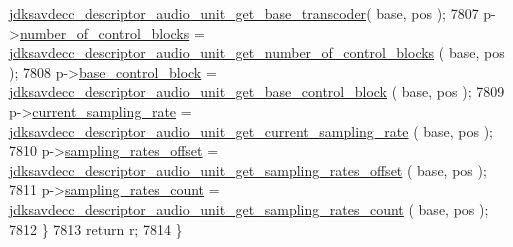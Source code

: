 \begin{DoxyCode}
      \hyperlink{group__descriptor__audio_ga255b528b5d801b3c172b8d199e03ef42}{jdksavdecc\_descriptor\_audio\_unit\_get\_base\_transcoder}( 
      base, pos );
7807         p->\hyperlink{structjdksavdecc__descriptor__audio__unit_a564f961a8cec6e8f7b4bfdbbbfe650d4}{number\_of\_control\_blocks} = 
      \hyperlink{group__descriptor__audio_ga30d371f29fe321c59cc09f811fb280b6}{jdksavdecc\_descriptor\_audio\_unit\_get\_number\_of\_control\_blocks}
      ( base, pos );
7808         p->\hyperlink{structjdksavdecc__descriptor__audio__unit_a9303491ec92ba42c28fb904c14d310b0}{base\_control\_block} = 
      \hyperlink{group__descriptor__audio_ga618003ae29a76ad480334653c52cb393}{jdksavdecc\_descriptor\_audio\_unit\_get\_base\_control\_block}
      ( base, pos );
7809         p->\hyperlink{structjdksavdecc__descriptor__audio__unit_a081e14c5c832a659daf22003ed8e918d}{current\_sampling\_rate} = 
      \hyperlink{group__descriptor__audio_gaf64e490813c4a70bd63a6f00374cb639}{jdksavdecc\_descriptor\_audio\_unit\_get\_current\_sampling\_rate}
      ( base, pos );
7810         p->\hyperlink{structjdksavdecc__descriptor__audio__unit_a9acd91129819909097f834e4592e8779}{sampling\_rates\_offset} = 
      \hyperlink{group__descriptor__audio_ga0ac3d7ddf66d4ffd285c518e692a0221}{jdksavdecc\_descriptor\_audio\_unit\_get\_sampling\_rates\_offset}
      ( base, pos );
7811         p->\hyperlink{structjdksavdecc__descriptor__audio__unit_a9e41095f67119ce7ad3da11e7a7fa520}{sampling\_rates\_count} = 
      \hyperlink{group__descriptor__audio_ga5f0d312d4823a74a68b4971a8302395d}{jdksavdecc\_descriptor\_audio\_unit\_get\_sampling\_rates\_count}
      ( base, pos );
7812     \}
7813     \textcolor{keywordflow}{return} r;
7814 \}
\end{DoxyCode}


